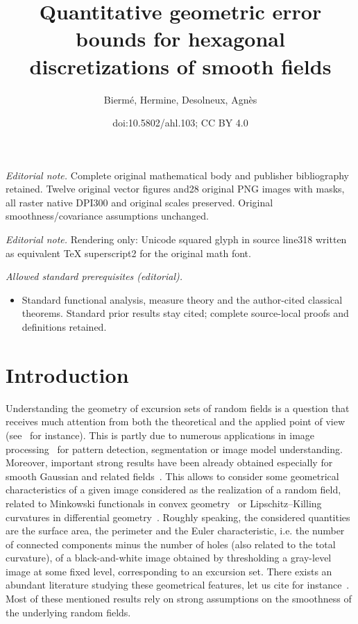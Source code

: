 \documentclass[10pt]{amsart}
\title{Quantitative geometric error bounds for hexagonal discretizations of smooth fields}
\author{Biermé, Hermine, Desolneux, Agnès}
\date{doi:10.5802/ahl.103; CC BY 4.0}
\theoremstyle{definition}\newtheorem{defi}[theo]{Definition}\newtheorem{rema}[theo]{Remark}\newtheorem{exam}[theo]{Example}\newtheorem{exem}[theo]{Example}\newtheorem{nota}[theo]{Notation}
\begin{document}
\maketitle
\noindent\textit{Editorial note.} Complete original mathematical body and publisher bibliography retained. Twelve original vector figures and28 original PNG images with masks, all raster native DPI300 and original scales preserved. Original smoothness/covariance assumptions unchanged.\par\medskip
\noindent\textit{Editorial note.} Rendering only: Unicode squared glyph in source line318 written as equivalent TeX superscript2 for the original math font.\par\medskip
\noindent\textit{Allowed standard prerequisites (editorial).}\begin{itemize}
\item Standard functional analysis, measure theory and the author-cited classical theorems. Standard prior results stay cited; complete source-local proofs and definitions retained.
\end{itemize}\medskip

\section{Introduction}

Understanding the geometry of excursion sets of random fields is a question that receives much attention from both the theoretical and the applied point of view (see~\cite{AdlerReview00} for instance). This is partly due to numerous applications in image processing~\cite{SerraBook,Worsley96} for pattern detection, segmentation or image model understanding. Moreover, important strong results have been already obtained especially for smooth Gaussian and related fields~\cite{AdlerTaylorBook}. This allows to consider some geometrical characteristics of a given image considered as the realization of a random field, related to Minkowski functionals in convex geometry~\cite{Stoyan87} or Lipschitz--Killing curvatures in differential geometry~\cite{Thale08}. Roughly speaking, the considered quantities are the surface area, the perimeter and the Euler characteristic, i.e. the number of connected components minus the number of holes (also related to the total curvature), of a black-and-white image obtained by thresholding a gray-level image at some fixed level, corresponding to an excursion set. There exists an abundant literature studying these geometrical features, let us cite for instance~\cite{Azais,DEL17,EstradeLeon, KV17,LachiezeRey2018II}. Most of these mentioned results rely on strong assumptions on the smoothness of the underlying random fields.
\end{document}
